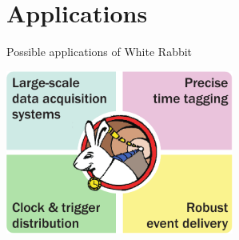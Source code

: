 \documentclass[compress,red]{beamer}
\begin{document}

\section{Applications}

\begin{frame}{Possible applications of White Rabbit}
\begin{center}
\includegraphics[width=7.5cm]{../../figures/applications/wr_apps.pdf}
\end{center}
\end{frame}
\end{document}
